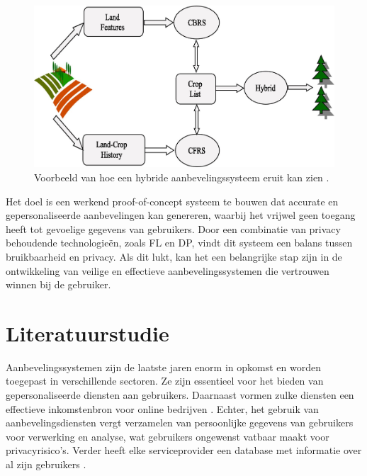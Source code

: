 \begin{figure}[h!]
  \centering
  \includegraphics[width=\linewidth]{../graphics/Hybrid_RS_Land_Voorbeeld.jpg}
  \caption{Voorbeeld van hoe een hybride aanbevelingssysteem eruit kan zien \autocite{Patel2020}.} 
  \label{fig:hybrid_rs_land_voorbeeld}
\end{figure}

Het doel is een werkend proof-of-concept systeem te bouwen dat accurate en gepersonaliseerde aanbevelingen kan genereren, waarbij het vrijwel geen toegang heeft tot gevoelige gegevens van gebruikers. Door een combinatie van privacy behoudende technologieën, zoals FL en DP, vindt dit systeem een balans tussen bruikbaarheid en privacy. Als dit lukt, kan het een belangrijke stap zijn in de ontwikkeling van veilige en effectieve aanbevelingssystemen die vertrouwen winnen bij de gebruiker.

\section{Literatuurstudie}
\label{sec:literatuurstudie}

Aanbevelingssystemen zijn de laatste jaren enorm in opkomst en worden toegepast in verschillende sectoren. Ze zijn essentieel voor het bieden van gepersonaliseerde diensten aan gebruikers. Daarnaast vormen zulke diensten een effectieve inkomstenbron voor online bedrijven \autocite{Mazeh2020, Wang2018}. Echter, het gebruik van aanbevelingsdiensten vergt verzamelen van persoonlijke gegevens van gebruikers voor verwerking en analyse, wat gebruikers ongewenst vatbaar maakt voor privacyrisico's. Verder heeft elke serviceprovider een database met informatie over al zijn gebruikers \autocite{Wang2018, Lex2023, Yang2020, Friedman2015}.

